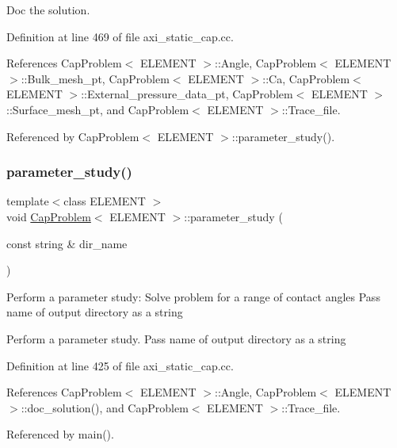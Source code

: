 Doc the solution. 



Definition at line 469 of file axi\+\_\+static\+\_\+cap.\+cc.



References Cap\+Problem$<$ E\+L\+E\+M\+E\+N\+T $>$\+::\+Angle, Cap\+Problem$<$ E\+L\+E\+M\+E\+N\+T $>$\+::\+Bulk\+\_\+mesh\+\_\+pt, Cap\+Problem$<$ E\+L\+E\+M\+E\+N\+T $>$\+::\+Ca, Cap\+Problem$<$ E\+L\+E\+M\+E\+N\+T $>$\+::\+External\+\_\+pressure\+\_\+data\+\_\+pt, Cap\+Problem$<$ E\+L\+E\+M\+E\+N\+T $>$\+::\+Surface\+\_\+mesh\+\_\+pt, and Cap\+Problem$<$ E\+L\+E\+M\+E\+N\+T $>$\+::\+Trace\+\_\+file.



Referenced by Cap\+Problem$<$ E\+L\+E\+M\+E\+N\+T $>$\+::parameter\+\_\+study().

\mbox{\label{classCapProblem_af54251f12b42b85c6caf88e5214f45da}} 
\subsubsection{\texorpdfstring{parameter\+\_\+study()}{parameter\_study()}}
{\footnotesize\ttfamily template$<$class E\+L\+E\+M\+E\+NT $>$ \\
void \hyperlink{classCapProblem}{Cap\+Problem}$<$ E\+L\+E\+M\+E\+NT $>$\+::parameter\+\_\+study (\begin{DoxyParamCaption}\item[{const string \&}]{dir\+\_\+name }\end{DoxyParamCaption})}

Perform a parameter study\+: Solve problem for a range of contact angles Pass name of output directory as a string

Perform a parameter study. Pass name of output directory as a string 

Definition at line 425 of file axi\+\_\+static\+\_\+cap.\+cc.



References Cap\+Problem$<$ E\+L\+E\+M\+E\+N\+T $>$\+::\+Angle, Cap\+Problem$<$ E\+L\+E\+M\+E\+N\+T $>$\+::doc\+\_\+solution(), and Cap\+Problem$<$ E\+L\+E\+M\+E\+N\+T $>$\+::\+Trace\+\_\+file.



Referenced by main().



